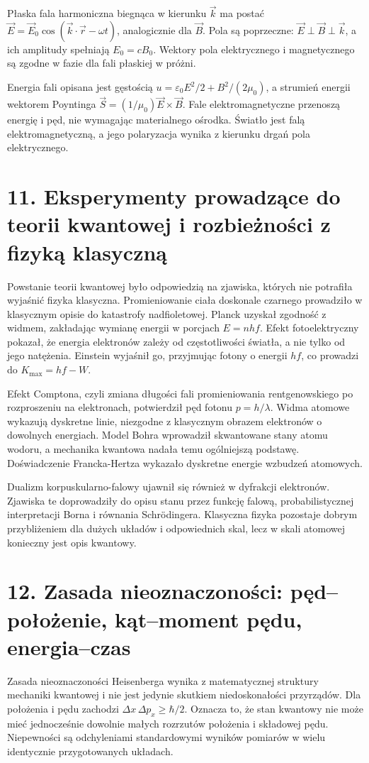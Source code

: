\documentclass[11pt,a4paper,oneside]{report}
\begin{document}
Płaska fala harmoniczna biegnąca w kierunku \(\vec k\) ma postać \(\vec E=\vec E_0\cos(\vec k\cdot\vec r-\omega t)\), analogicznie dla \(\vec B\). Pola są poprzeczne: \(\vec E\perp\vec B\perp\vec k\), a ich amplitudy spełniają \(E_0=cB_0\). Wektory pola elektrycznego i magnetycznego są zgodne w fazie dla fali płaskiej w próżni.

Energia fali opisana jest gęstością \(u=\varepsilon_0E^2/2+B^2/(2\mu_0)\), a strumień energii wektorem Poyntinga \(\vec S=(1/\mu_0)\vec E\times\vec B\). Fale elektromagnetyczne przenoszą energię i pęd, nie wymagając materialnego ośrodka. Światło jest falą elektromagnetyczną, a jego polaryzacja wynika z kierunku drgań pola elektrycznego.

\section{11. Eksperymenty prowadzące do teorii kwantowej i rozbieżności z fizyką klasyczną}
Powstanie teorii kwantowej było odpowiedzią na zjawiska, których nie potrafiła wyjaśnić fizyka klasyczna. Promieniowanie ciała doskonale czarnego prowadziło w klasycznym opisie do katastrofy nadfioletowej. Planck uzyskał zgodność z widmem, zakładając wymianę energii w porcjach \(E=nhf\). Efekt fotoelektryczny pokazał, że energia elektronów zależy od częstotliwości światła, a nie tylko od jego natężenia. Einstein wyjaśnił go, przyjmując fotony o energii \(hf\), co prowadzi do \(K_{\max}=hf-W\).

Efekt Comptona, czyli zmiana długości fali promieniowania rentgenowskiego po rozproszeniu na elektronach, potwierdził pęd fotonu \(p=h/\lambda\). Widma atomowe wykazują dyskretne linie, niezgodne z klasycznym obrazem elektronów o dowolnych energiach. Model Bohra wprowadził skwantowane stany atomu wodoru, a mechanika kwantowa nadała temu ogólniejszą podstawę. Doświadczenie Francka-Hertza wykazało dyskretne energie wzbudzeń atomowych.

Dualizm korpuskularno-falowy ujawnił się również w dyfrakcji elektronów. Zjawiska te doprowadziły do opisu stanu przez funkcję falową, probabilistycznej interpretacji Borna i równania Schrödingera. Klasyczna fizyka pozostaje dobrym przybliżeniem dla dużych układów i odpowiednich skal, lecz w skali atomowej konieczny jest opis kwantowy.

\section{12. Zasada nieoznaczoności: pęd–położenie, kąt–moment pędu, energia–czas}
Zasada nieoznaczoności Heisenberga wynika z matematycznej struktury mechaniki kwantowej i nie jest jedynie skutkiem niedoskonałości przyrządów. Dla położenia i pędu zachodzi \(\Delta x\,\Delta p_x\geq\hbar/2\). Oznacza to, że stan kwantowy nie może mieć jednocześnie dowolnie małych rozrzutów położenia i składowej pędu. Niepewności są odchyleniami standardowymi wyników pomiarów w wielu identycznie przygotowanych układach.
\end{document}
